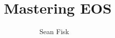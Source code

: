 \documentclass{beamer}
\title{Mastering EOS}
\author[Fisk \& Woodring]{
  Sean Fisk~~\mailtohref{<fiskse@mail.gvsu.edu>}}
\begin{document}
\begin{frame}[fragile]{}
  \begin{columns}[T]
    \begin{column}{0.33\textwidth}
      
      
      
      
    \end{column}
    \begin{column}{0.33\textwidth}
      
      
      
      
    \end{column}
    \begin{column}{0.33\textwidth}
      
      
      
      
      
    \end{column}
  \end{columns}
\end{frame}
\end{document}
